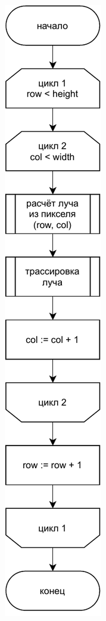 \begin{figure}
    \centering
    \includegraphics[width=\linewidth,height=\textheight,keepaspectratio]{diagrams/fancy.pdf}
\end{figure}
